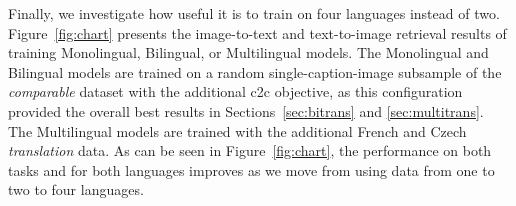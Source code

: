 Finally, we investigate how useful it is to train on four languages instead of two. Figure~\ref{fig:chart} presents the image-to-text and text-to-image retrieval results of training Monolingual, Bilingual, or Multilingual models. The Monolingual and Bilingual models are trained on a random single-caption-image subsample of the {\it comparable} dataset with the additional c2c objective, as this configuration provided the overall best results in Sections~\ref{sec:bitrans} and \ref{sec:multitrans}. The Multilingual models are trained with the additional French and Czech {\it translation} data. As can be seen in Figure~\ref{fig:chart}, the performance on both tasks and for both languages improves as we move from using data from one to two to four languages.



%
%


